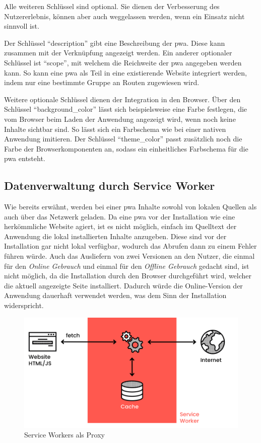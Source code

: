 \documentclass[12pt, parskip=half]{scrartcl}       %
\begin{document}
Alle weiteren Schlüssel sind optional.
Sie dienen der Verbesserung des Nutzererlebnis, können aber auch weggelassen werden, wenn ein Einsatz nicht sinnvoll ist.

Der Schlüssel \enquote{description} gibt eine Beschreibung der \ac{pwa}.
Diese kann zusammen mit der Verknüpfung angezeigt werden.
Ein anderer optionaler Schlüssel ist \enquote{scope}, mit welchem die Reichweite der \ac{pwa} angegeben werden kann.
So kann eine \ac{pwa} als Teil in eine existierende Website integriert werden, indem nur eine bestimmte Gruppe an Routen zugewiesen wird.\cite{webdev_addmanifest}

Weitere optionale Schlüssel dienen der Integration in den Browser.
Über den Schlüssel \enquote{background\_color} lässt sich beispielsweise eine Farbe festlegen, die vom Browser beim Laden der Anwendung angezeigt wird, wenn noch keine Inhalte sichtbar sind.
So lässt sich ein Farbschema wie bei einer nativen Anwendung imitieren.
Der Schlüssel \enquote{theme\_color} passt zusätzlich noch die Farbe der Browserkomponenten an, sodass ein einheitliches Farbschema für die \ac{pwa} entsteht.



\subsection{Datenverwaltung durch Service Worker}

Wie bereits erwähnt, werden bei einer \ac{pwa} Inhalte sowohl von lokalen Quellen als auch über das Netzwerk geladen.
Da eine \ac{pwa} vor der Installation wie eine herkömmliche Website agiert, ist es nicht möglich, einfach im Quelltext der Anwendung die lokal installierten Inhalte anzugeben.
Diese sind vor der Installation gar nicht lokal verfügbar, wodurch das Abrufen dann zu einem Fehler führen würde.
Auch das Ausliefern von zwei Versionen an den Nutzer, die einmal für den \textit{Online Gebrauch} und einmal für den \textit{Offline Gebrauch} gedacht sind, ist nicht möglich, da die Installation durch den Browser durchgeführt wird, welcher die aktuell angezeigte Seite installiert.
Dadurch würde die Online-Version der Anwendung dauerhaft verwendet werden, was dem Sinn der Installation widerspricht.

\begin{figure}
  \centering
  \includegraphics[width=1\linewidth]{src/ServiceWorker-Heise.png}
  \caption{Service Workers als Proxy\cite{src_serviceworker_heise}}
  \label{fig:heise_serviceworker}
\end{figure}
\end{document}
